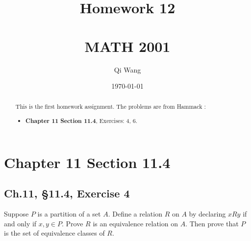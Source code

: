 \documentclass[12pt]{amsart}
\numberwithin{equation}{section}
\theoremstyle{definition}
\theoremstyle{remark}
\begin{document}




\author[Qi]{Qi Wang}
\address{University of Colorado, Department of Mathematics,  Campus Box 395,
Boulder, CO 80309-0395}
\date{\today}



\title[Homework 12]{Homework 12 \\ \ \\  MATH 2001}

\begin{abstract} 
This is the first homework assignment.  The problems are from Hammack \cite[Ch.~11, \S 11.4]{H13}:
\begin{itemize}

\item \textbf{Chapter 11}  
\textbf{Section 11.4}, Exercises:  4, 6.

\end{itemize}
\end{abstract}


\maketitle


\tableofcontents





\section*{Chapter 11 Section 11.4}



\subsection*{Ch.11, \S 11.4,  Exercise 4}  Suppose $ P $ is a partition of a set $ A $. Define a relation $ R $ on $ A $ by declaring $ xRy $ if and only if $ x, y \in P $. Prove $ R $ is an equivalence relation on $ A $. Then prove that $ P $ is the set of equivalence classes of $ R $. 
\end{document}
